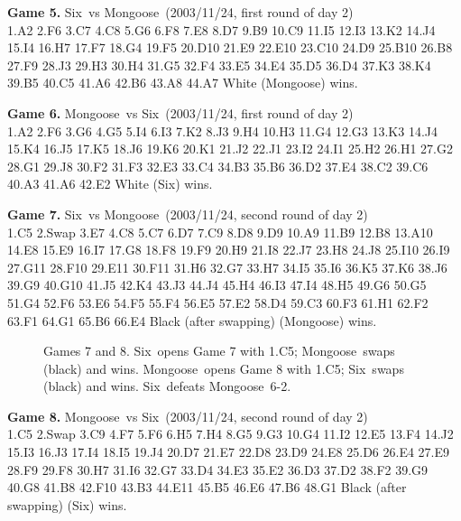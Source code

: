 \documentclass[12pt]{article}
\def\Six{{\sc Six}}
\def\Mg{{\sc Mongoose}}
\begin{document}
{\begin{trivlist}
\item[] {\bf Game 5.} \Six\ vs \Mg\ (2003/11/24, first round of day 2)\\
1.A2 2.F6 3.C7 4.C8 5.G6 6.F8 7.E8 8.D7 9.B9 10.C9
11.I5 12.I3 13.K2 14.J4 15.I4 16.H7 17.F7 18.G4 19.F5
20.D10 21.E9 22.E10 23.C10 24.D9 25.B10 26.B8 27.F9 28.J3
29.H3 30.H4 31.G5 32.F4 33.E5 34.E4 35.D5 36.D4 37.K3
38.K4 39.B5 40.C5 41.A6 42.B6 43.A8 44.A7
White (\Mg) wins.

\item[] {\bf Game 6.} \Mg\ vs \Six\ (2003/11/24, first round of day 2)\\
1.A2 2.F6 3.G6 4.G5 5.I4 6.I3 7.K2 8.J3 9.H4 10.H3
11.G4 12.G3 13.K3 14.J4 15.K4 16.J5 17.K5 18.J6 19.K6 20.K1
21.J2 22.J1 23.I2 24.I1 25.H2 26.H1 27.G2 28.G1 29.J8 30.F2
31.F3 32.E3 33.C4 34.B3 35.B6 36.D2 37.E4 38.C2 39.C6 40.A3
41.A6 42.E2 White (\Six) wins.

\item[] {\bf Game 7.} \Six\ vs \Mg\ (2003/11/24, second round of day 2)\\
1.C5 2.Swap 3.E7 4.C8 5.C7 6.D7 7.C9 8.D8 9.D9 10.A9
11.B9 12.B8 13.A10 14.E8 15.E9 16.I7 17.G8 18.F8 19.F9
20.H9 21.I8 22.J7 23.H8 24.J8 25.I10 26.I9 27.G11 28.F10
29.E11 30.F11 31.H6 32.G7 33.H7 34.I5 35.I6 36.K5 37.K6
38.J6 39.G9 40.G10 41.J5 42.K4 43.J3 44.J4 45.H4 46.I3
47.I4 48.H5 49.G6 50.G5 51.G4 52.F6 53.E6 54.F5 55.F4
56.E5 57.E2 58.D4 59.C3 60.F3 61.H1 62.F2 63.F1 64.G1
65.B6 66.E4
Black (after swapping) (\Mg) wins.

\begin{figure}\label{fig4}
\hspace*{-.2in}
\caption{Games 7 and 8.
\Six\ opens Game 7 with 1.C5; \Mg\ swaps (black) and wins.
\Mg\ opens Game 8 with 1.C5;
\Six\ swaps (black) and wins.
\Six\ defeats \Mg\ 6-2.}
\end{figure}

\item[] {\bf Game 8.} \Mg\ vs \Six\ (2003/11/24, second round of day 2) \\
1.C5 2.Swap 3.C9 4.F7 5.F6 6.H5 7.H4 8.G5 9.G3 10.G4
11.I2 12.E5 13.F4 14.J2 15.I3 16.J3 17.I4 18.I5 19.J4 20.D7
21.E7 22.D8 23.D9 24.E8 25.D6 26.E4 27.E9 28.F9 29.F8 30.H7
31.I6 32.G7 33.D4 34.E3 35.E2 36.D3 37.D2 38.F2 39.G9 40.G8
41.B8 42.F10 43.B3 44.E11 45.B5 46.E6 47.B6 48.G1
Black (after swapping) (\Six) wins.
\end{trivlist}
}



\end{document}
